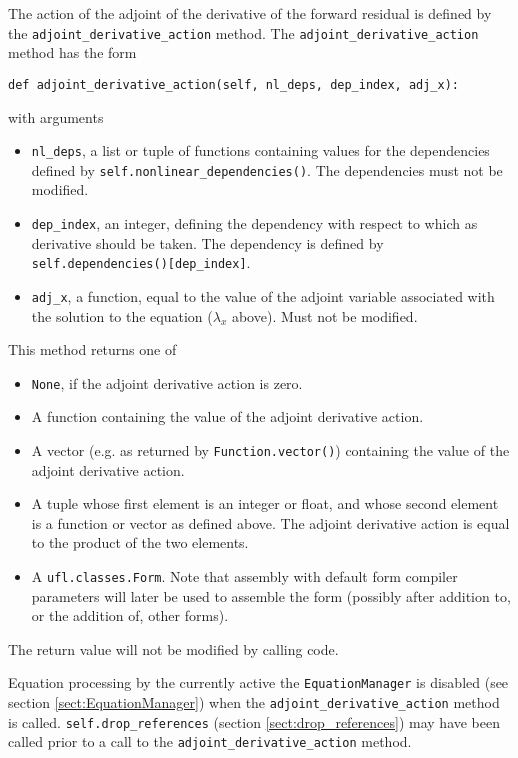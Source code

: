 \documentclass[11pt]{article}
\begin{document}
The action of the adjoint of the derivative of the forward residual is defined
by the \texttt{adjoint\_derivative\_action} method. The
\texttt{adjoint\_derivative\_action} method has the form
\begin{lstlisting}
def adjoint_derivative_action(self, nl_deps, dep_index, adj_x):
\end{lstlisting}
with arguments
\begin{itemize}
  \item \texttt{nl\_deps}, a list or tuple of functions containing values for
    the dependencies defined by \texttt{self.nonlinear\_dependencies()}. The
    dependencies must not be modified.
  \item \texttt{dep\_index}, an integer, defining the dependency with respect
    to which as derivative should be taken. The dependency is defined by
    \texttt{self.dependencies()[dep\_index]}.
  \item \texttt{adj\_x}, a function, equal to the value of the adjoint variable
    associated with the solution to the equation ($\lambda_x$ above). Must not
    be modified.
\end{itemize}
This method returns one of
\begin{itemize}
  \item \texttt{None}, if the adjoint derivative action is zero.
  \item A function containing the value of the adjoint derivative action.
  \item A vector (e.g. as returned by \texttt{Function.vector()}) containing
    the value of the adjoint derivative action.
  \item A tuple whose first element is an integer or float, and whose second
    element is a function or vector as defined above. The adjoint derivative
    action is equal to the product of the two elements.
  \item A \texttt{ufl.classes.Form}. Note that assembly with default form
    compiler parameters will later be used to assemble the form (possibly after
    addition to, or the addition of, other forms).
\end{itemize}
The return value will not be modified by calling code.

Equation processing by the currently active the \texttt{EquationManager} is
disabled (see section \ref{sect:EquationManager}) when the
\texttt{adjoint\_derivative\_action} method is called.
\texttt{self.drop\_references} (section \ref{sect:drop_references}) may have
been called prior to a call to the \texttt{adjoint\_derivative\_action} method.
\end{document}
